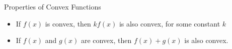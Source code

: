 \documentclass{beamer}
\begin{document}
	\begin{frame}{Properties of Convex Functions}
	\begin{itemize}
	\item<1-> If $f(x)$ is convex, then $kf(x)$ is also convex, for some constant $k$
	\item<2-> If $f(x)$ and $g(x)$ are convex, then $f(x) + g(x)$ is also convex.
	\end{itemize}
	
	\end{frame}
\end{document}
